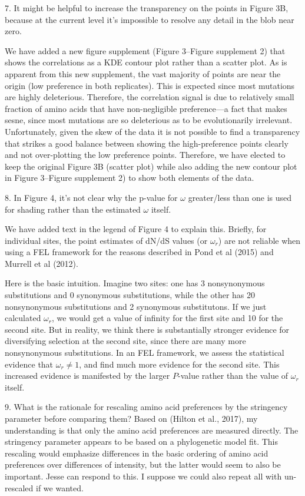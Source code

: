 \documentclass[11pt, oneside]{article}   	%
\begin{document}
7. It might be helpful to increase the transparency on the points in Figure 3B, because at the current level it's impossible to resolve any detail in the blob near zero. 

{\color{black}
We have added a new figure supplement (Figure 3--Figure supplement 2) that shows the correlations as a KDE contour plot rather than a scatter plot.
As is apparent from this new supplement, the vast majority of points are near the origin (low preference in both replicates). 
This is expected since most mutations are highly deleterious.
Therefore, the correlation signal is due to relatively small fraction of amino acids that have non-negligible preference---a fact that makes sesne, since most mutations are so deleterious as to be evolutionarily irrelevant.
Unfortunately, given the skew of the data it is not possible to find a transparency that strikes a good balance between showing the high-preference points clearly and not over-plotting the low preference points.
Therefore, we have elected to keep the original Figure 3B (scatter plot) while also adding the new contour plot in Figure 3--Figure supplement 2) to show both elements of the data.
}

8. In Figure 4, it's not clear why the p-value for $\omega$ greater/less than one is used for shading rather than the estimated $\omega$ itself. 

{\color{black}
We have added text in the legend of Figure 4 to explain this.
Briefly, for individual sites, the point estimates of dN/dS values (or $\omega_r$) are not reliable when using a FEL framework for the reasons described in Pond et al (2015) and Murrell et al (2012).

Here is the basic intuition. 
Imagine two sites: one has 3 nonsynonymous substitutions and 0 synonymous substitutions, while the other has 20 nonsynonymous substitutions and 2 synonymous substitutons.
If we just calculated $\omega_r$, we would get a value of infinity for the first site and 10 for the second site.
But in reality, we think there is substantially stronger evidence for diversifying selection at the second site, since there are many more nonsynonymous substitutions.
In an FEL framework, we assess the statistical evidence that $\omega_r \ne 1$, and find much more evidence for the second site.
This increased evidence is manifested by the larger $P$-value rather than the value of $\omega_r$ itself.}

9. What is the rationale for rescaling amino acid preferences by the stringency parameter before comparing them? Based on (Hilton et al., 2017), my understanding is that only the amino acid preferences are measured directly. The stringency parameter appears to be based on a phylogenetic model fit. This rescaling would emphasize differences in the basic ordering of amino acid preferences over differences of intensity, but the latter would seem to also be important. 
{\color{red}
Jesse can respond to this. I suppose we could also repeat all with un-rescaled if we wanted.}
\end{document}
